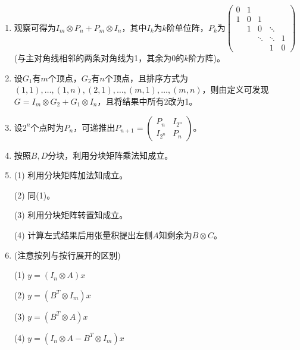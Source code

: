 \documentclass[a4paper,UTF8,fontset=windows]{ctexart}
\begin{document}
\begin{enumerate}
\item
观察可得为$I_m\otimes P_n+P_m\otimes I_n$，其中$I_k$为$k$阶单位阵，$P_k$为$\begin{pmatrix}0&1&&&\\1&0&1&&\\[-1ex]&1&0&\ddots&\\[-1ex]&&\ddots&\ddots&1\\&&&1&0\end{pmatrix}$(与主对角线相邻的两条对角线为1，其余为0的$k$阶方阵)。

\item
设$G_1$有$m$个顶点，$G_2$有$n$个顶点，且排序方式为$(1,1),\dots,(1,n),(2,1),\dots,(m,1),\dots,(m,n)$，则由定义可发现$G=I_m\otimes G_2+G_1\otimes I_n$，且将结果中所有2改为1。

\item
设$2^n$个点时为$P_n$，可递推出$P_{n+1}=\begin{pmatrix}P_n&I_{2^n}\\I_{2^n}&P_n\end{pmatrix}$。

\item
按照$B,D$分块，利用分块矩阵乘法知成立。

\item
(1) 利用分块矩阵加法知成立。

(2) 同(1)。

(3) 利用分块矩阵转置知成立。

(4) 计算左式结果后用张量积提出左侧$A$知剩余为$B\otimes C$。

\item
(注意按列与按行展开的区别)

(1) $y=(I_n\otimes A)x$

(2) $y=(B^T\otimes I_m)x$

(3) $y=(B^T\otimes A)x$

(4) $y=(I_n\otimes A-B^T\otimes I_m) x$
\end{enumerate}
\end{document}
